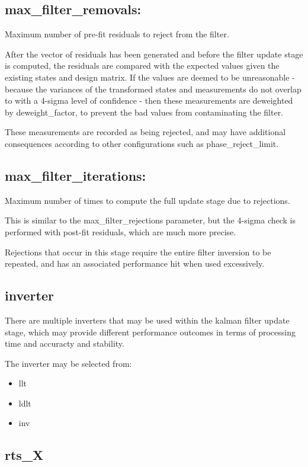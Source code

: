 \subsection*{max\_filter\_removals:}

Maximum number of pre-fit residuals to reject from the filter.

After the vector of residuals has been generated and before the filter update stage is computed, the residuals are compared with the expected values given the existing states and design matrix.
If the values are deemed to be unreasonable - because the variances of the transformed states and measurements do not overlap to with a 4-sigma level of confidence - then these measurements are deweighted by deweight\_factor, to prevent the bad values from contaminating the filter.

These measurements are recorded as being rejected, and may have additional consequences according to other configurations such as phase\_reject\_limit.

\subsection*{max\_filter\_iterations:}

Maximum number of times to compute the full update stage due to rejections.

This is similar to the max\_filter\_rejections parameter, but the 4-sigma check is performed with post-fit residuals, which are much more precise.

Rejections that occur in this stage require the entire filter inversion to be repeated, and has an associated performance hit when used excessively.


\subsection*{inverter}

There are multiple inverters that may be used within the kalman filter update stage, which may provide different performance outcomes in terms of processing time and accuracty and stability.

The inverter may be selected from:
\begin{itemize}
\item llt
\item ldlt
\item inv
\end {itemize}

\subsection*{rts\_X}

